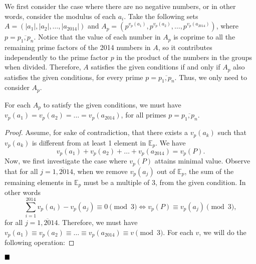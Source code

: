 \documentclass[11pt]{article}
\newenvironment{solution}[1][Solution]{%
  \proof[\normalfont \faPenNib \hspace{0.2cm} \ttfamily \scshape \large #1]%
}{\(\hfill \blacksquare\){\parfillskip0pt\par}}
\theoremstyle{definition}
\begin{document}
\begin{solution}
            We first consider the case where there are no negative numbers, or in other words, consider the modulus of each \(a_i\). Take the following sets \(A = \left(|a_1|, |a_2|, \dots, |a_{2014}|\right)\) and \(A_p = \left(p^{v_p(a_1)}, p^{v_p(a_2)}, \dots, p^{v_p(a_{2014})}\right)\), where \(p = \overline{p_1,p_n}\). Notice that the value of each number in \(A_p\) is coprime to all the remaining prime factors of the 2014 numbers in \(A\), so it contributes independently to the prime factor \(p\) in the product of the numbers in the groups when divided. Therefore, \(A\) satisfies the given conditions if and only if \(A_p\) also satisfies the given conditions, for every prime \(p = \overline{p_1,p_n}\). Thus, we only need to consider \(A_p\).
            
            \begin{claim}
                For each \(A_p\) to satisfy the given conditions, we must have \(v_p(a_1) = v_p(a_2) = \dots = v_p(a_{2014})\), for all primes \(p = \overline{p_1,p_n}\).
            \end{claim}

            \begin{proof}
                Assume, for sake of contradiction, that there exists a \(v_p(a_k)\) such that \(v_p(a_k)\) is different from at least 1 element in \(\mathbb{E}_p\). We have
                \[v_p(a_1) + v_p(a_2) + \dots + v_p(a_{2014}) = v_p(P).\]
                Now, we first investigate the case where \(v_p(P)\) attains minimal value. Observe that for all \(j = \overline{1,2014}\), when we remove \(v_p(a_j)\) out of \(\mathbb{E}_p\), the sum of the remaining elements in \(\mathbb{E}_p\) must be a multiple of 3, from the given condition. In other words
                \[\sum_{i=1}^{2014} v_p(a_i) - v_p(a_j) \equiv 0 \pmod{3} \iff v_p(P) \equiv v_p(a_j) \pmod{3},\]
                for all \(j = \overline{1,2014}\). Therefore, we must have \(v_p(a_1) \equiv v_p(a_2) \equiv \dots \equiv v_p(a_{2014}) \equiv v \pmod{3}\). For each \(v\), we will do the following operation:


\end{proof}
\end{solution}
\end{document}
